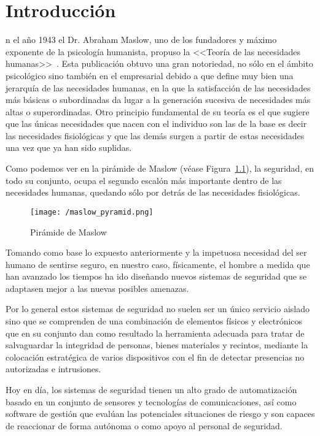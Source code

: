 
\chapter{Introducción}
\label{chap:introduccion}

n el año 1943 el Dr. Abraham Maslow, uno de los fundadores y
máximo exponente  de la psicología  humanista, propuso la  <<Teoría de
las     necesidades      humanas>>~\cite{Maslow}.   Esta publicación  obtuvo una  gran notoriedad,  no
sólo en el ámbito psicológico sino  también en el empresarial debido a
que define  muy bien una jerarquía  de las necesidades humanas,  en la
que la satisfacción  de las necesidades más básicas  o subordinadas da
lugar  a   la  generación   sucesiva  de   necesidades  más   altas  o
superordinadas.  Otro principio  fundamental de  su teoría  es el  que
sugiere que las únicas necesidades que  nacen con el individuo son las
de  la base  es decir  las necesidades  fisiológicas y  que las  demás
surgen a partir de estas necesidades una vez que ya han sido suplidas.

Como podemos ver en la pirámide de Maslow (véase Figura~\ref{fig:maslow_pyramid}), la seguridad, en todo su conjunto, ocupa el segundo escalón más importante dentro de las necesidades humanas, quedando sólo por detrás de las necesidades fisiológicas.

\begin{figure}[!h]
\centering
\texttt{[image: /maslow\_pyramid.png]}
\caption{Pirámide de Maslow~\cite{Maslowpyramid}}
\label{fig:maslow_pyramid}
\end{figure}

Tomando como base lo expuesto anteriormente y la impetuosa necesidad del ser humano de sentirse seguro, en nuestro caso, físicamente, el hombre a medida que han avanzado los tiempos ha ido diseñando nuevos sistemas de seguridad que se adaptasen mejor a las nuevas posibles amenazas.

Por lo  general estos  sistemas de  seguridad no  suelen ser  un único
servicio  aislado  sino  que  se  comprenden  de  una  combinación  de
elementos físicos y electrónicos que en su conjunto dan como resultado
la herramienta adecuada  para tratar de salvaguardar  la integridad de
personas,  bienes  materiales  y   recintos,  mediante  la  colocación
estratégica de varios  dispositivos con el fin  de detectar presencias
no autorizadas e intrusiones.

Hoy  en  día, los  sistemas  de  seguridad  tienen  un alto  grado  de
automatización  basado en  un conjunto  de sensores  y tecnologías  de
comunicaciones,  así  como  software   de  gestión  que  evalúan  las
potenciales situaciones de riesgo y son capaces de reaccionar de forma
autónoma o como apoyo al personal de seguridad.

